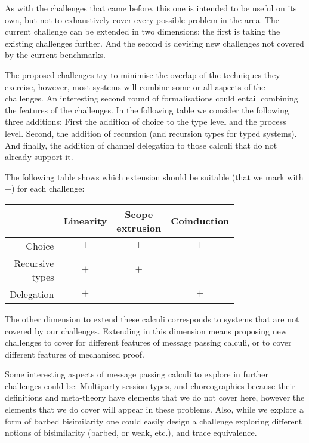 \documentclass[runningheads]{llncs}
\begin{document}
As with the challenges that came before, this one is intended to be
useful on its own, but not to exhaustively cover every possible
problem in the area. The current challenge can be extended in two
dimensions: the first is taking the existing challenges further.
And the second is devising new challenges not covered by the current
benchmarks.

The proposed challenges try to minimise the overlap of the techniques
they exercise, however, most systems will combine some or all aspects
of the challenges. An interesting second round of formalisations could
entail combining the features of the challenges. In the following
table we consider the following three additions: First the addition of
choice to the type level and the process level. Second, the addition
of recursion (and recursion types for typed systems). And finally, the
addition of channel delegation to those calculi that do not already
support it.

The following table shows which extension should be suitable (that we
mark with $+$) for each challenge:

\vspace{.5em}

\begin{center}\small
  \begin{tabular}{|r|c|c|c|}
    \hline
    & Linearity & \shortstack{Scope \\ extrusion} & Coinduction \\
    \hline
    Choice & $+$ & $+$  & $+$ \\
    \hline
    \shortstack{Recursive \\ types} & $+$  & $+$ & \\
    \hline
    Delegation & $+$ & & $+$ \\
    \hline
  \end{tabular}
\end{center}

\vspace{.5em}

The other dimension to extend these calculi corresponds to systems
that are not covered by our challenges. Extending in this dimension
means proposing new challenges to cover for different features of
message passing calculi, or to cover different features of mechanised
proof.

Some interesting aspects of message passing calculi to explore in
further challenges could be: Multiparty session types, and
choreographies because their definitions and meta-theory have elements
that we do not cover here, however the elements that we do cover will
appear in these problems. Also, while we explore a form of barbed
bisimilarity one could easily design a challenge exploring different
notions of bisimilarity (barbed, or weak, etc.), and trace
equivalence.
\end{document}
